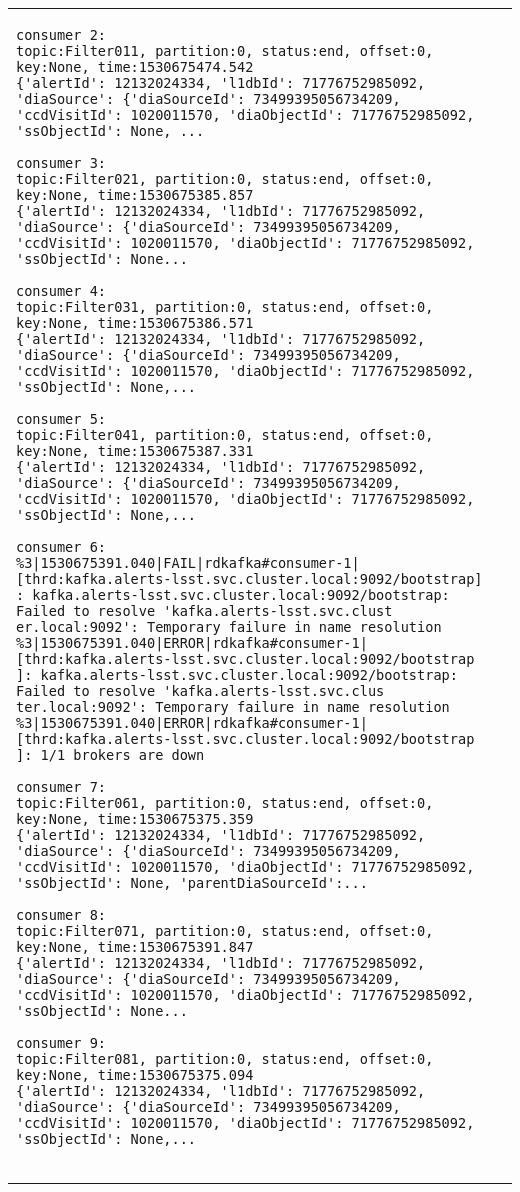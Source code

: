 \documentclass[DM,lsstdraft,STR,toc]{lsstdoc}
\begin{document}
\begin{longtable}{p{2cm}p{14cm}}
{\begin{verbatim}
consumer 2:
topic:Filter011, partition:0, status:end, offset:0, key:None, time:1530675474.542
{'alertId': 12132024334, 'l1dbId': 71776752985092, 'diaSource': {'diaSourceId': 73499395056734209, 
'ccdVisitId': 1020011570, 'diaObjectId': 71776752985092, 'ssObjectId': None, ...

consumer 3:
topic:Filter021, partition:0, status:end, offset:0, key:None, time:1530675385.857
{'alertId': 12132024334, 'l1dbId': 71776752985092, 'diaSource': {'diaSourceId': 73499395056734209, 
'ccdVisitId': 1020011570, 'diaObjectId': 71776752985092, 'ssObjectId': None...

consumer 4:
topic:Filter031, partition:0, status:end, offset:0, key:None, time:1530675386.571
{'alertId': 12132024334, 'l1dbId': 71776752985092, 'diaSource': {'diaSourceId': 73499395056734209, 
'ccdVisitId': 1020011570, 'diaObjectId': 71776752985092, 'ssObjectId': None,...

consumer 5:
topic:Filter041, partition:0, status:end, offset:0, key:None, time:1530675387.331
{'alertId': 12132024334, 'l1dbId': 71776752985092, 'diaSource': {'diaSourceId': 73499395056734209, 
'ccdVisitId': 1020011570, 'diaObjectId': 71776752985092, 'ssObjectId': None,...

consumer 6:
%3|1530675391.040|FAIL|rdkafka#consumer-1| [thrd:kafka.alerts-lsst.svc.cluster.local:9092/bootstrap]
: kafka.alerts-lsst.svc.cluster.local:9092/bootstrap: Failed to resolve 'kafka.alerts-lsst.svc.clust
er.local:9092': Temporary failure in name resolution
%3|1530675391.040|ERROR|rdkafka#consumer-1| [thrd:kafka.alerts-lsst.svc.cluster.local:9092/bootstrap
]: kafka.alerts-lsst.svc.cluster.local:9092/bootstrap: Failed to resolve 'kafka.alerts-lsst.svc.clus
ter.local:9092': Temporary failure in name resolution
%3|1530675391.040|ERROR|rdkafka#consumer-1| [thrd:kafka.alerts-lsst.svc.cluster.local:9092/bootstrap
]: 1/1 brokers are down

consumer 7:
topic:Filter061, partition:0, status:end, offset:0, key:None, time:1530675375.359
{'alertId': 12132024334, 'l1dbId': 71776752985092, 'diaSource': {'diaSourceId': 73499395056734209, 
'ccdVisitId': 1020011570, 'diaObjectId': 71776752985092, 'ssObjectId': None, 'parentDiaSourceId':...

consumer 8:
topic:Filter071, partition:0, status:end, offset:0, key:None, time:1530675391.847
{'alertId': 12132024334, 'l1dbId': 71776752985092, 'diaSource': {'diaSourceId': 73499395056734209, 
'ccdVisitId': 1020011570, 'diaObjectId': 71776752985092, 'ssObjectId': None...

consumer 9:
topic:Filter081, partition:0, status:end, offset:0, key:None, time:1530675375.094
{'alertId': 12132024334, 'l1dbId': 71776752985092, 'diaSource': {'diaSourceId': 73499395056734209, 
'ccdVisitId': 1020011570, 'diaObjectId': 71776752985092, 'ssObjectId': None,...


\end{verbatim}}
\end{longtable}
\end{document}
